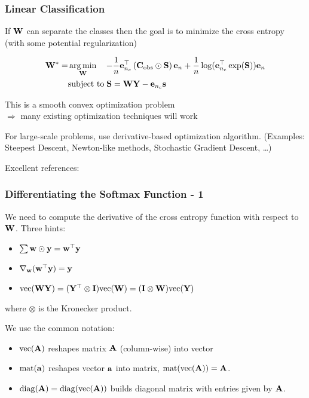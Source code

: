 \documentclass[12pt,fleqn,handout]{beamer}
\begin{document}
\begin{frame}\frametitle{Linear Classification}

If ${\bf W}$ can separate the classes then the goal is to minimize the cross entropy (with some potential regularization)

\begin{align*}
 {\bf W}^* = & \operatorname*{arg\,min}_{{\bf W}} \quad - \frac{1}{n}{\bf e}_{n_c}^{\top} \left( {\bf C}_{\rm obs} \odot {\bf S}\right) {\bf e}_{n} 
+ \frac{1}{n} \log({\bf e}_{n_c}^\top \exp({\bf S})){\bf e}_n \\
          & \text{subject to} \;{\bf S} = {\bf W} {\bf Y} - {\bf e}_{n_c} {\bf s}
\end{align*}
\pause

This is a smooth convex optimization problem \\ $\Rightarrow$ many existing optimization techniques will work

\bigskip

For large-scale problems, use derivative-based optimization algorithm. (Examples: Steepest Descent, Newton-like methods,  Stochastic Gradient Descent, \ldots)

\bigskip

Excellent references: \cite{NocedalWright2006,BoydVandenberghe2004,Beck2014}
\end{frame}
 \begin{frame}\frametitle{Differentiating the Softmax Function - 1}

We need to compute the derivative of the cross entropy function with respect to ${\bf W}$.
Three hints:
\begin{itemize}
\item $\sum {\bf w} \odot {\bf y} = {\bf w}^{\top} {\bf y} $
\item $\nabla_{{\bf w}} ({\bf w}^{\top} {\bf y}) = {\bf y}$
\item ${\rm vec} ({\bf W} {\bf Y}) = ({\bf Y}^\top \otimes {\bf I}) {\rm vec} ({\bf W}) = ({\bf I} \otimes {\bf W}) {\rm vec}({\bf Y})$
\end{itemize}
where $\otimes$ is the Kronecker product.

\bigskip



We use the common notation:
\begin{itemize}
	\item ${\rm vec}({\bf A})$ reshapes matrix ${\bf A}$ (column-wise) into vector
	\item ${\rm mat}({\bf a})$ reshapes vector ${\bf a}$ into matrix, ${\rm mat}({\rm vec}({\bf A})) = {\bf A}$.
	\item ${\rm diag}({\bf A}) = {\rm diag}({\rm vec}( {\bf A}))$ builds diagonal matrix with entries given by ${\bf A}$. 
\end{itemize}


\end{frame}
\end{document}
